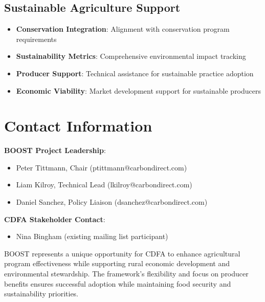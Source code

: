 \documentclass[title=small,preset=opensansnote,par=skip]{article}
\begin{document}
\subsection{Sustainable Agriculture Support}
\label{sec:orgef5f49e}
\begin{itemize}
\item \textbf{\textbf{Conservation Integration}}: Alignment with conservation program requirements
\item \textbf{\textbf{Sustainability Metrics}}: Comprehensive environmental impact tracking
\item \textbf{\textbf{Producer Support}}: Technical assistance for sustainable practice adoption
\item \textbf{\textbf{Economic Viability}}: Market development support for sustainable producers
\end{itemize}
\section{Contact Information}
\label{sec:orgc6905ac}

\textbf{\textbf{BOOST Project Leadership}}:
\begin{itemize}
\item Peter Tittmann, Chair (ptittmann@carbondirect.com)
\item Liam Kilroy, Technical Lead (lkilroy@carbondirect.com)
\item Daniel Sanchez, Policy Liaison (dsanchez@carbondirect.com)
\end{itemize}

\textbf{\textbf{CDFA Stakeholder Contact}}:
\begin{itemize}
\item Nina Bingham (existing mailing list participant)
\end{itemize}

BOOST represents a unique opportunity for CDFA to enhance agricultural program effectiveness while supporting rural economic development and environmental stewardship. The framework's flexibility and focus on producer benefits ensures successful adoption while maintaining food security and sustainability priorities.
\end{document}
